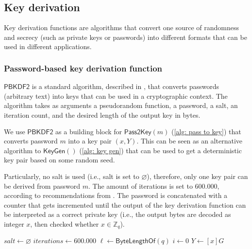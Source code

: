 \clearpage
\subsection{Key derivation} \label{app: key derivation}
Key derivation functions are algorithms that convert one source of randomness and secrecy (such as private keys or passwords) into different formats that can be used in different applications.


\subsubsection{Password-based key derivation function} \label{app: password-based key derivation function}
$\mathsf{PBKDF2}$ is a standard algorithm, described in \cite{RFC8018}, that converts passwords (arbitrary text) into keys that can be used in a cryptographic context. The algorithm takes as arguments a pseudorandom function, a password, a salt, an iteration count, and the desired length of the output key in bytes.

We use $\mathsf{PBKDF2}$ as a building block for $\mathsf{Pass2Key}(m)$ (\cref{alg: pass to key}) that converts password $m$ into a key pair $(x, Y)$. This can be seen as an alternative algorithm to $\mathsf{KeyGen}()$ (\cref{alg: key gen}) that can be used to get a deterministic key pair based on some random seed.

Particularly, no salt is used (i.e., salt is set to $\varnothing$), therefore, only one key pair can be derived from password $m$. The amount of iterations is set to 600.000, according to recommendations from \cite{OWASP}. The password is concatenated with a counter that gets incremented until the output of the key derivation function can be interpreted as a correct private key (i.e., the output bytes are decoded as integer $x$, then checked whether $x \in \mathbb{Z}_q$).

\begin{algorithm}[ht]
    \DontPrintSemicolon
    \caption{$\mathsf{Pass2Key}(m)$}
    \label{alg: pass to key}
    
    $salt \gets \varnothing$ \;
    $iterations \gets 600.000$ \;
    $\ell \gets \mathsf{ByteLengthOf}(q)$ 
    $i \gets 0$ \;
    $Y \gets [x]G$ \;
     
\end{algorithm}


